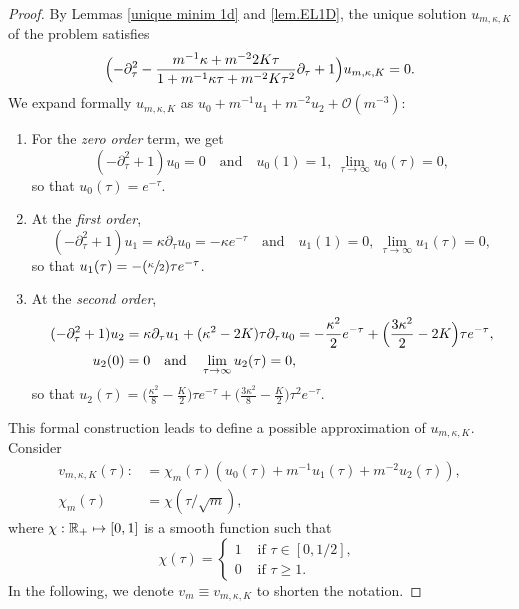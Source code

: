 \documentclass[10pt]{amsart}
\newcommand\mto{\mathchoice{\longmapsto}{\mapsto}{\mapsto}{\mapsto}}
\newcommand{\Psfrac}[2]{(\sfrac{#1}{#2})}
\newcommand{\scrO}{\mathscr{O}}
\theoremstyle{plain}
\theoremstyle{definition}
\newcommand{\RR}{\mathbb{R}}
\let\pa\partial
\begin{document}
\begin{proof}
By Lemmas \ref{unique minim 1d} and \ref{lem.EL1D}, the unique solution $u_{m,\kappa,K}$ of the problem satisfies
\[
\Bigl(
-\pa_\tau^2
-\frac{m^{-1}\kappa + m^{-2}2K\tau}{1 + m^{-1}\kappa \tau + m^{-2}K\tau^2}\pa_\tau
+1
\Bigr)u_{m,\kappa,K} = 0.
\]
We expand formally $u_{m,\kappa,K}$ as $u_0 + m^{-1}u_1 + m^{-2}u_2 + \scrO(m^{-3})$:
\begin{enumerate}
\item For the \emph{zero order} term, we get
\[
(-\pa_\tau^2 +1)u_0 = 0 \quad\text{and}\quad  u_0(1) = 1,\ \lim_{\tau\to \infty} u_0(\tau) = 0,
\]
so that $u_0(\tau)= e^{-\tau}$.
\item At the \emph{first order},
\[
(-\pa_\tau^2 +1)u_1 = \kappa\pa_\tau u_0 = -\kappa e^{-\tau} \quad\text{and}\quad  u_1(1) = 0,\ \lim_{\tau\to \infty} u_1(\tau) = 0,
\]
so that $u_1(\tau)= -\Psfrac{\kappa}{2}\tau e^{-\tau}$.
\item At the \emph{second order},
\[\begin{split}
(-\pa_\tau^2 +1)u_2 &= \kappa\pa_\tau u_1 + (\kappa^2-2K)\tau \pa_\tau u_0 = -\frac{\kappa^2}{2}e^{-\tau} + \Bigl(\frac{3\kappa^2}{2}-2K\Bigr)\tau e^{-\tau},
\\
u_2(0) &= 0 \quad\text{and}\quad \lim_{\tau\to \infty} u_2(\tau) = 0,
\end{split}\]
so that
$u_2(\tau)=
\bigl(
\frac{\kappa^2}{8}-\frac{K}{2}
\bigr)\tau e^{-\tau}
+
\bigl(
\frac{3\kappa^2}{8}-\frac{K}{2}
\bigr)\tau^2e^{-\tau}.
$
\end{enumerate}
This formal construction leads to define a possible approximation of $u_{m,\kappa,K}$.
Consider
\begin{equation}\label{eq:formaltestfun1}\begin{split}
v_{m,\kappa,K}(\tau) :&= \chi_m(\tau)\left(u_0(\tau) + m^{-1}u_1(\tau) + m^{-2}u_2(\tau)\right),\\
\chi_m(\tau) &= \chi(\tau/\sqrt{m}),
\end{split}\end{equation}
where $\chi : \RR_+\mto [0,1]$ is a smooth function such that
\[
\chi(\tau) = \begin{cases}
1 &\mbox{ if }\tau\in[0,1/2],\\
0 &\mbox{ if }\tau\geq 1.
\end{cases}\
\]
In the following, we denote $v_m \equiv v_{m,\kappa,K}$ to shorten the notation.


\end{proof}
\end{document}
